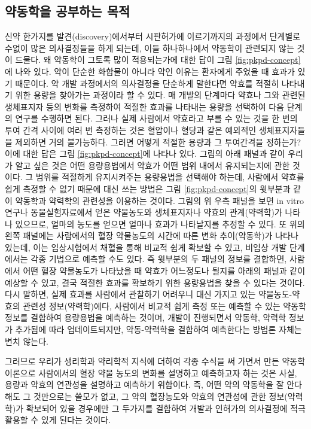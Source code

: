\documentclass[
  11pt,
  krantz2, a4paper, twoside]{krantz}
\begin{document}
\hypertarget{uxc57duxb3d9uxd559uxc744-uxacf5uxbd80uxd558uxb294-uxbaa9uxc801}{%
\subsection{약동학을 공부하는 목적}\label{uxc57duxb3d9uxd559uxc744-uxacf5uxbd80uxd558uxb294-uxbaa9uxc801}}

신약 한가지를 발견(discovery)에서부터 시판허가에 이르기까지의 과정에서
단계별로 수없이 많은 의사결정들을 하게 되는데, 이들 하나하나에서
약동학이 관련되지 않는 것이 드물다. 왜 약동학이 그토록 많이 적용되는가에
대한 답이 그림 \ref{fig:pkpd-concept}에 나와 있다. 약이 단순한 화합물이 아니라 약인 이유는
환자에게 주었을 때 효과가 있기 때문이다. 약 개발 과정에서의 의사결정을
단순하게 말한다면 약효를 적절히 나타내기 위한 용량을 찾아가는 과정이라
할 수 있다. 매 개발의 단계마다 약효나 그와 관련된 생체표지자 등의 변화를
측정하여 적절한 효과를 나타내는 용량을 선택하여 다음 단계의 연구를
수행하면 된다. 그러나 실제 사람에서 약효라고 부를 수 있는 것을 한 번의
투여 간격 사이에 여러 번 측정하는 것은 혈압이나 혈당과 같은 예외적인
생체표지자들을 제외하면 거의 불가능하다. 그러면 어떻게 적절한 용량과 그
투여간격을 정하는가? 이에 대한 답은 그림 \ref{fig:pkpd-concept}에 나타나 있다. 그림의 아래
패널과 같이 우리가 알고 싶은 것은 어떤 용량용법에서 약효가 어떤 범위
내에서 유지되는지에 관한 것이다. 그 범위를 적절하게 유지시켜주는
용량용법을 선택해야 하는데, 사람에서 약효를 쉽게 측정할 수 없기 때문에
대신 쓰는 방법은 그림 \ref{fig:pkpd-concept}의 윗부분과 같이 약동학과 약력학의 관련성을
이용하는 것이다. 그림의 위 우측 패널을 보면 in vitro 연구나
동물실험자료에서 얻은 약물농도와 생체표지자나 약효의 관계(약력학)가
나타나 있으므로, 얼마의 농도를 얻으면 얼마나 효과가 나타날지를 추정할 수
있다. 또 위의 왼쪽 패널에는 사람에서의 혈장 약물농도의 시간에 따른 변화
추이(약동학)가 나타나 있는데, 이는 임상시험에서 채혈을 통해 비교적 쉽게
확보할 수 있고, 비임상 개발 단계에서는 각종 기법으로 예측할 수도 있다.
즉 윗부분의 두 패널의 정보를 결합하면, 사람에서 어떤 혈장 약물농도가
나타났을 때 약효가 어느정도나 될지를 아래의 패널과 같이 예상할 수 있고,
결국 적절한 효과를 확보하기 위한 용량용법을 찾을 수 있다는 것이다. 다시
말하면, 실제 효과를 사람에서 관찰하기 어려우니 대신 가지고 있는
약물농도-약효의 관련성 정보(약력학)에다, 사람에서 비교적 쉽게 측정 또는
예측할 수 있는 약동학 정보를 결합하여 용량용법을 예측하는 것이며, 개발이
진행되면서 약동학, 약력학 정보가 추가됨에 따라 업데이트되지만,
약동-약력학을 결합하여 예측한다는 방법론 자체는 변치 않는다.

그러므로 우리가 생리학과 약리학적 지식에 더하여 각종 수식을 써 가면서
만든 약동학 이론으로 사람에서의 혈장 약물 농도의 변화를 설명하고
예측하고자 하는 것은 사실, 용량과 약효의 연관성을 설명하고 예측하기
위함이다. 즉, 어떤 약의 약동학을 잘 안다 해도 그 것만으로는 쓸모가 없고,
그 약의 혈장농도와 약효의 연관성에 관한 정보(약력학)가 확보되어 있을
경우에만 그 두가지를 결합하여 개발과 인허가의 의사결정에 적극 활용할 수
있게 된다는 것이다.
\end{document}
